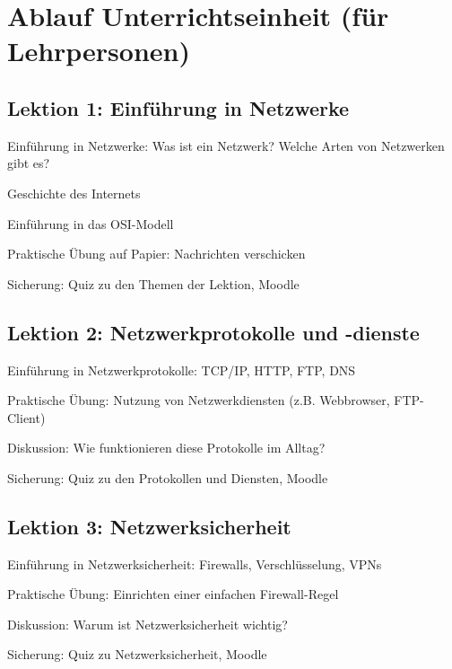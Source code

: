 \section{Ablauf Unterrichtseinheit (für Lehrpersonen)}
\subsection{Lektion 1: Einführung in Netzwerke}
\begin{todolist}
    \item Einführung in Netzwerke: Was ist ein Netzwerk? Welche Arten von Netzwerken gibt es?
    \item Geschichte des Internets
    \item Einführung in das OSI-Modell
    \item Praktische Übung auf Papier: Nachrichten verschicken
    \item Sicherung: Quiz zu den Themen der Lektion, Moodle
\end{todolist}

\subsection{Lektion 2: Netzwerkprotokolle und -dienste}
\begin{todolist}
    \item Einführung in Netzwerkprotokolle: TCP/IP, HTTP, FTP, DNS
    \item Praktische Übung: Nutzung von Netzwerkdiensten (z.B. Webbrowser, FTP-Client)
    \item Diskussion: Wie funktionieren diese Protokolle im Alltag?
    \item Sicherung: Quiz zu den Protokollen und Diensten, Moodle
\end{todolist}

\subsection{Lektion 3: Netzwerksicherheit}
\begin{todolist}
    \item Einführung in Netzwerksicherheit: Firewalls, Verschlüsselung, VPNs
    \item Praktische Übung: Einrichten einer einfachen Firewall-Regel
    \item Diskussion: Warum ist Netzwerksicherheit wichtig?
    \item Sicherung: Quiz zu Netzwerksicherheit, Moodle
\end{todolist}

